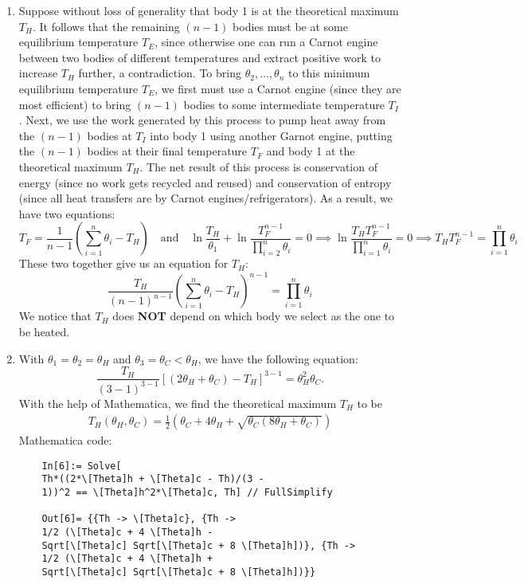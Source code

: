 \documentclass{article}
\theoremstyle{definition}
\newcommand{\f}[2]{\frac{#1}{#2}}
\newcommand{\lp}{\left(}
\newcommand{\rp}{\right)}
\newcommand{\lb}{\left[}
\newcommand{\rb}{\right]}
\begin{document}
\begin{enumerate}[label=(\alph*)]
	\item Suppose without loss of generality that body 1 is at the theoretical maximum $T_H$. It follows that the remaining $(n-1)$ bodies must be at some equilibrium temperature $T_E$, since otherwise one can run a Carnot engine between two bodies of different temperatures and extract positive work to increase $T_H$ further, a contradiction. To bring $\theta_2,\dots, \theta_n$ to this minimum equilibrium temperature $T_E$, we first must use a Carnot engine (since they are most efficient) to bring $(n-1)$ bodies to some intermediate temperature $T_I$. Next, we use the work generated by this process to pump heat away from the $(n-1)$ bodies at $T_I$ into body 1 using another Garnot engine, putting the $(n-1)$ bodies at their final temperature $T_F$ and body 1 at the theoretical maximum $T_H$. The net result of this process is conservation of energy (since no work gets recycled and reused) and conservation of entropy (since all heat transfers are by Carnot engines/refrigerators). As a result, we have two equations:
	\begin{equation*}
	\boxed{T_F = \f{1}{n-1}\lp \sum_{i=1}^n \theta_i - T_H\rp} \quad  \text{and} \quad \ln \f{T_H}{\theta_1} + \ln \f{T_F^{n-1}}{\prod_{i=2}^n \theta_i} = 0 \implies \ln \f{T_H T_F^{n-1}}{\prod_{i=1}^n \theta_i} = 0 \implies \boxed{T_H T_F^{n-1} = \prod_{i=1}^n \theta_i}
	\end{equation*}
	These two together give us an equation for $T_H$:
	\begin{equation*}
	\boxed{\f{T_H}{(n-1)^{n-1}} \lp \sum_{i=1}^n \theta_i - T_H \rp^{n-1} = \prod_{i=1}^n \theta_i }
	\end{equation*}
	We notice that $T_H$ does \textbf{NOT} depend on which body we select as the one to be heated. 
	
	
	\item With $\theta_1 = \theta_2 = \theta_H$ and $\theta_3 = \theta_C < \theta_H$, we have the following equation:
	\begin{equation*}
	\f{T_H}{(3-1)^{3-1}} \lb (2\theta_H + \theta_C) - T_H \rb^{3-1} = \theta_H^2 \theta_C.
	\end{equation*}
	With the help of Mathematica, we find the theoretical maximum $T_H$ to be 
	\begin{align*}
	\boxed{ T_H(\theta_H,\theta_C) = \f{1}{2} \lp \theta_C + 4\theta_H + \sqrt{\theta_C(8\theta_H + \theta_C)} \rp}
	\end{align*}
	Mathematica code:
	\begin{lstlisting}
	In[6]:= Solve[
	Th*((2*\[Theta]h + \[Theta]c - Th)/(3 - 
	1))^2 == \[Theta]h^2*\[Theta]c, Th] // FullSimplify
	
	Out[6]= {{Th -> \[Theta]c}, {Th -> 
	1/2 (\[Theta]c + 4 \[Theta]h - 
	Sqrt[\[Theta]c] Sqrt[\[Theta]c + 8 \[Theta]h])}, {Th -> 
	1/2 (\[Theta]c + 4 \[Theta]h + 
	Sqrt[\[Theta]c] Sqrt[\[Theta]c + 8 \[Theta]h])}}
	\end{lstlisting}
\end{enumerate}
\end{document}

